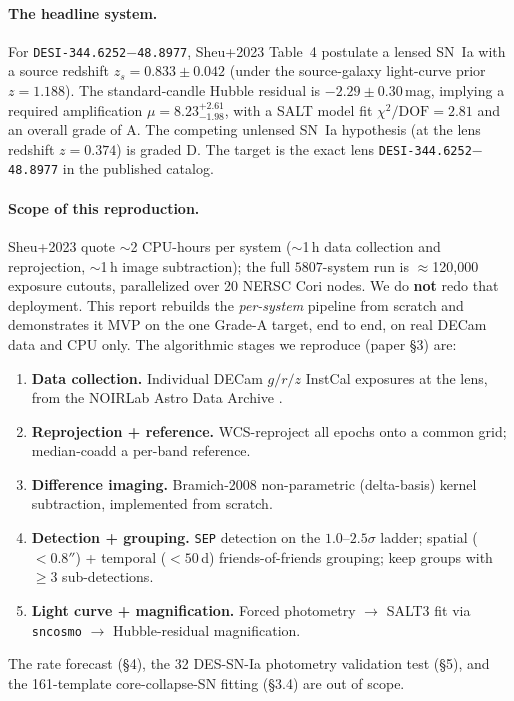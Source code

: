\documentclass[11pt,letterpaper]{article}
\newcommand{\muamp}{\ensuremath{\mu}}
\newcommand{\target}{\texttt{DESI-344.6252$-$48.8977}}
\begin{document}
\paragraph{The headline system.}
For \target, Sheu+2023 Table~4 postulate a lensed SN~Ia with a source
redshift $z_s = 0.833\pm0.042$ (under the source-galaxy light-curve prior
$z=1.188$). The standard-candle Hubble residual is $-2.29\pm0.30$\,mag,
implying a required amplification $\muamp = 8.23^{+2.61}_{-1.98}$, with a
SALT model fit $\chi^2/\mathrm{DOF}=2.81$ and an overall grade of A. The
competing unlensed SN~Ia hypothesis (at the lens redshift $z=0.374$) is
graded D. The target is the exact lens
\texttt{DESI-344.6252$-$48.8977} in the published \citet{storfer2024catalog}
catalog.

\paragraph{Scope of this reproduction.}
Sheu+2023 quote $\sim$2 CPU-hours per system ($\sim$1\,h data collection
and reprojection, $\sim$1\,h image subtraction); the full $5807$-system run
is $\approx$120{,}000 exposure cutouts, parallelized over 20 NERSC Cori
nodes. We do \textbf{not} redo that deployment. This report rebuilds the
\emph{per-system} pipeline from scratch and demonstrates it MVP on the one
Grade-A target, end to end, on real DECam data and CPU only. The
algorithmic stages we reproduce (paper \S3) are:
\begin{enumerate}
\item \textbf{Data collection.} Individual DECam $g/r/z$ InstCal exposures
      at the lens, from the NOIRLab Astro Data Archive
      \autocite{noirlab2025archive}.
\item \textbf{Reprojection + reference.} WCS-reproject all epochs onto a
      common grid; median-coadd a per-band reference.
\item \textbf{Difference imaging.} Bramich-2008 \autocite{bramich2008}
      non-parametric (delta-basis) kernel subtraction, implemented from
      scratch.
\item \textbf{Detection + grouping.} \texttt{SEP} \autocite{barbary2016sep}
      detection on the $1.0$--$2.5\sigma$ ladder; spatial ($<0.8''$) +
      temporal ($<50$\,d) friends-of-friends grouping; keep groups with
      $\geq3$ sub-detections.
\item \textbf{Light curve + magnification.} Forced photometry $\to$ SALT3
      \autocite{kenworthy2021salt3} fit via \texttt{sncosmo}
      \autocite{barbary2024sncosmo} $\to$ Hubble-residual magnification.
\end{enumerate}
The rate forecast (\S4), the 32 DES-SN-Ia photometry validation test
(\S5), and the 161-template core-collapse-SN fitting (\S3.4) are out of
scope.
\end{document}
